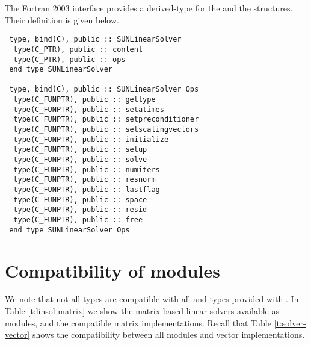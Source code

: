 The Fortran 2003 interface provides a  derived-type for the
 and the  structures.
Their definition is given below.
\begin{verbatim}
 type, bind(C), public :: SUNLinearSolver
  type(C_PTR), public :: content
  type(C_PTR), public :: ops
 end type SUNLinearSolver

 type, bind(C), public :: SUNLinearSolver_Ops
  type(C_FUNPTR), public :: gettype
  type(C_FUNPTR), public :: setatimes
  type(C_FUNPTR), public :: setpreconditioner
  type(C_FUNPTR), public :: setscalingvectors
  type(C_FUNPTR), public :: initialize
  type(C_FUNPTR), public :: setup
  type(C_FUNPTR), public :: solve
  type(C_FUNPTR), public :: numiters
  type(C_FUNPTR), public :: resnorm
  type(C_FUNPTR), public :: lastflag
  type(C_FUNPTR), public :: space
  type(C_FUNPTR), public :: resid
  type(C_FUNPTR), public :: free
 end type SUNLinearSolver_Ops
\end{verbatim}


\section{Compatibility of  modules}\label{ss:sunlinsol_compatibility}

We note that not all {\sunlinsol} types are compatible with all
{\sunmatrix} and {\nvector} types provided with {\sundials}.  In Table
\ref{t:linsol-matrix} we show the matrix-based linear solvers
available as {\sunlinsol} modules, and the compatible matrix
implementations.  Recall that Table \ref{t:solver-vector} shows the
compatibility between all {\sunlinsol} modules and vector
implementations.

